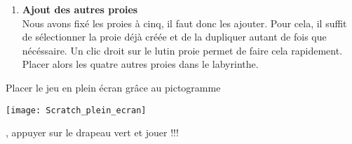 \begin{enumerate}
         \item {\bf Ajout des autres proies} \pfh{} \\
            Nous avons fixé les proies à cinq, il faut donc les ajouter. Pour cela, il suffit de sélectionner la proie déjà créée et de la \textcolor{B1}{dupliquer} autant de fois que nécéssaire. Un clic droit sur le lutin proie permet de faire cela rapidement. \\
            Placer alors les quatre autres proies dans le labyrinthe.
      \end{enumerate}   
    
   \partie[let's go !]
      Placer le jeu en plein écran grâce au pictogramme \parbox{1cm}{\texttt{[image: Scratch\_plein\_ecran]}}, appuyer sur le {\textcolor{B1}{drapeau vert}} et jouer !!!
